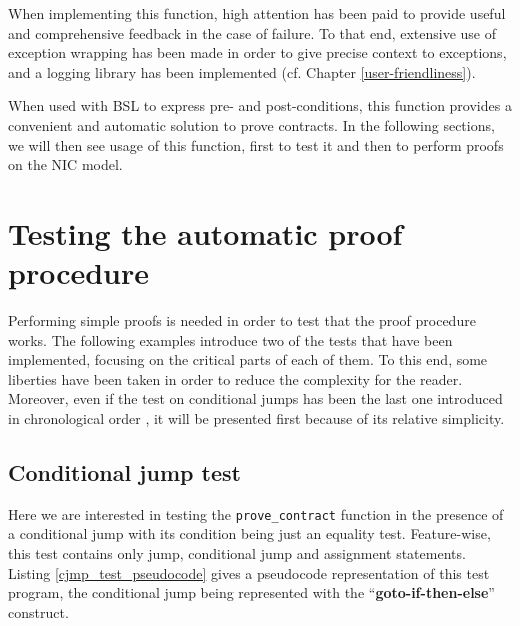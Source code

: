 \documentclass{kththesis}
\begin{document}
{

When implementing this function, high attention has been paid to provide useful and comprehensive feedback in the case of failure. To that end, extensive use of exception wrapping has been made in order to give precise context to exceptions, and a logging library has been implemented (cf. Chapter \ref{user-friendliness}).

When used with \gls{BSL} to express pre- and post-conditions, this function provides a convenient and automatic solution to prove contracts. In the following sections, we will then see usage of this function, first to test it and then to perform proofs on the NIC model.

\section{Testing the automatic proof procedure}

Performing simple proofs is needed in order to test that the proof procedure works. The following examples introduce two of the tests that have been implemented, focusing on the critical parts of each of them. To this end, some liberties have been taken in order to reduce the complexity for the reader. Moreover, even if the test on conditional jumps has been the last one introduced in chronological order \footnotemark, it will be presented first because of its relative simplicity.


\subsection{Conditional jump test} \label{cjmp_test}

Here we are interested in testing the \texttt{prove\_contract} function in the presence of a conditional jump with its condition being just an equality test. Feature-wise, this test contains only jump, conditional jump and assignment statements. Listing \ref{cjmp_test_pseudocode} gives a pseudocode representation of this test program, the conditional jump being represented with the ``\textbf{goto-if-then-else}'' construct.

}
\end{document}
